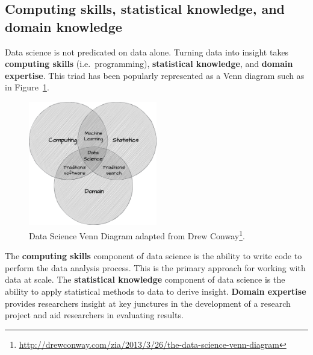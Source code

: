 \documentclass[
  letterpaper,
  DIV=11,
  numbers=noendperiod]{scrreport}
\theoremstyle{definition}
\theoremstyle{remark}
\DeclareRobustCommand{\href}[2]{#2\footnote{\url{#1}}}
\begin{document}
\hypertarget{computing-skills-statistical-knowledge-and-domain-knowledge}{%
\subsection{Computing skills, statistical knowledge, and domain
knowledge}\label{computing-skills-statistical-knowledge-and-domain-knowledge}}

Data science is not predicated on data alone. Turning data into insight
takes \textbf{computing skills} (i.e.~programming), \textbf{statistical
knowledge}, and \textbf{domain expertise}. This triad has been popularly
represented as a Venn diagram such as in
Figure~\ref{fig-intro-data-science-venn}.

\begin{figure}[H]

{\centering \includegraphics[width=0.5\textwidth,height=\textheight]{figures/text-analysis/ta-ds-venn.drawio.png}

}

\caption{\label{fig-intro-data-science-venn}Data Science Venn Diagram
adapted from
\href{http://drewconway.com/zia/2013/3/26/the-data-science-venn-diagram}{Drew
Conway}.}

\end{figure}

The \textbf{computing skills} component of data science is the ability
to write code to perform the data analysis process. This is the primary
approach for working with data at scale. The \textbf{statistical
knowledge} component of data science is the ability to apply statistical
methods to data to derive insight. \textbf{Domain expertise} provides
researchers insight at key junctures in the development of a research
project and aid researchers in evaluating results.
\end{document}
